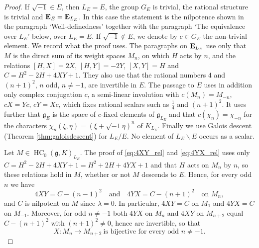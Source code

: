 \documentclass[a4paper,12pt,reqno]{amsart}
\newcommand{\EE}{{\rm\bf E}}
\DeclareMathOperator{\HC}{\mathrm{HC}}
\theoremstyle{plain}
\theoremstyle{remark}
\begin{document}
    \begin{proof}
    If $\sqrt{-1}\in E$, then $L_E=E$, the group $G_E$ is trivial, the rational structure is trivial and $\EE_E=\EE_{L_E}$. In this case the statement is the nilpotence shown in the paragraph \lq{}Well-definedness\rq{} together with the paragraph \lq{}The equivalence over $L_E$\rq{} below, over $L_E=E$. If $\sqrt{-1}\not\in E$, we denote by $c\in G_E$ the non-trivial element. We record what the proof uses. The paragraphs on $\EE_{L_E}$ use only that $M$ is the direct sum of its weight spaces $M_n$, on which $H$ acts by $n$, and the relations $[H,X]=2X$, $[H,Y]=-2Y$, $[X,Y]=H$ and $C=H^2-2H+4XY+1$. They also use that the rational numbers $4$ and $(n+1)^2$, $n$ odd, $n\neq-1$, are invertible in $E$. The passage to $E$ uses in addition only complex conjugation $c$, a semi-linear involution with $c(M_n)=M_{-n}$, $cX=Yc$, $cY=Xc$, which fixes rational scalars such as $\frac14$ and $(n+1)^2$. It uses further that $\mathfrak{g}_E$ is the space of $c$-fixed elements of $\mathfrak{g}_{L_E}$ and that $c(\chi_n)=\chi_{-n}$ for the characters $\chi_n(\xi,\eta)=(\xi+\sqrt{-1}\eta)^n$ of $K_{L_E}$. Finally we use Galois descent (Theorem \ref{thm:galoisdescent}) for $L_E/E$. No element of $L_E\smallsetminus E$ occurs as a scalar.

    Let $M\in\HC_0(\mathfrak{g},K)_{L_E}$. The proof of \eqref{eq:4XY_rel} and \eqref{eq:4YX_rel} uses only $C=H^2-2H+4XY+1=H^2+2H+4YX+1$ and that $H$ acts on $M_n$ by $n$, so these relations hold in $M$, whether or not $M$ descends to $E$. Hence, for every odd $n$ we have
    \begin{equation}
      4XY=C-(n-1)^2\quad\text{and}\quad 4YX=C-(n+1)^2\quad\text{on } M_n,
      \label{eq:4XYcyclic}
    \end{equation}
    and $C$ is nilpotent on $M$ since $\lambda=0$. In particular, $4XY=C$ on $M_1$ and $4YX=C$ on $M_{-1}$. Moreover, for odd $n\neq-1$ both $4YX$ on $M_n$ and $4XY$ on $M_{n+2}$ equal $C-(n+1)^2$ with $(n+1)^2\neq0$, hence are invertible, so that
    \begin{equation}
      X\colon M_n\to M_{n+2}\ \text{is bijective for every odd } n\neq-1.
      \label{eq:Xbijectivecyclic}
    \end{equation}


\end{proof}
\end{document}
